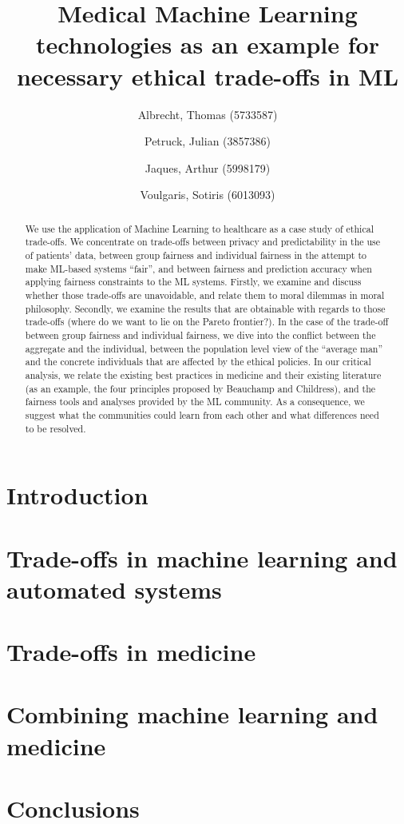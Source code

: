 \documentclass[11pt,english]{article}
\title{Medical Machine Learning technologies as an example for necessary ethical trade-offs in ML}
\author{
    Albrecht, Thomas (5733587)
    \and
    Petruck, Julian (3857386)
    \and
    Jaques, Arthur (5998179)
    \and Voulgaris, Sotiris (6013093)}
\begin{document}
\maketitle

\begin{abstract}
    We use the application of Machine Learning to healthcare as a case study of ethical trade-offs.
    We concentrate on trade-offs between privacy and predictability in the use of patients' data, between group fairness and individual fairness in the attempt to make ML-based systems ``fair'', and between fairness and prediction accuracy when applying fairness constraints to the ML systems.
    Firstly, we examine and discuss whether those trade-offs are unavoidable, and relate them to moral dilemmas in moral philosophy.
    Secondly, we examine the results that are obtainable with regards to those trade-offs (where do we want to lie on the Pareto frontier?).
    In the case of the trade-off between group fairness and individual fairness, we dive into the conflict between the aggregate and the individual, between the population level view of the ``average man'' and the concrete individuals that are affected by the ethical policies.
    In our critical analysis, we relate the existing best practices in medicine and their existing literature (as an example, the four principles proposed by Beauchamp and Childress), and the fairness tools and analyses provided by the ML community.
    As a consequence, we suggest what the communities could learn from each other and what differences need to be resolved.
\end{abstract}


\setcounter{tocdepth}{2}
\tableofcontents



\section{Introduction}


\section{Trade-offs in machine learning and automated systems}


\section{Trade-offs in medicine}


\section{Combining machine learning and medicine}


\section{Conclusions}




\clearpage


\end{document}
